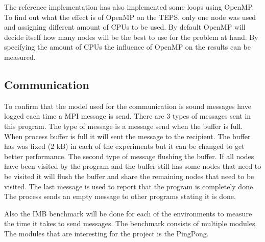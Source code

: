 The reference  implementation has also implemented some loops using OpenMP. To find out what the effect is of OpenMP on the TEPS, only one node was used and assigning different amount of CPUs to be used. By default OpenMP will decide itself how many nodes will be the best to use for the problem at hand. By specifying the amount of CPUs the influence of OpenMP on the results can be measured.    

    
\subsection{Communication}
To confirm that the model used for the communication is sound messages have logged each time a MPI message is send. There are 3 types of messages sent in this program. The type of message is a message send when the buffer is full. When process buffer is full it will sent the message to the recipient. The buffer has was fixed (2 kB) in each of the experiments but it can be changed to get better performance. The second type of message flushing the buffer. If all nodes have been visited by the program and the buffer still has some nodes that need to be visited it will flush the buffer and share the remaining nodes that need to be visited. The last message is used to report that the program is completely done. The process sends an empty message to other programs stating it is done.

Also the IMB benchmark will be done for each of the environments to measure the time it takes to send messages. The benchmark consists of multiple modules. The modules that are interesting for the project is the PingPong. 

